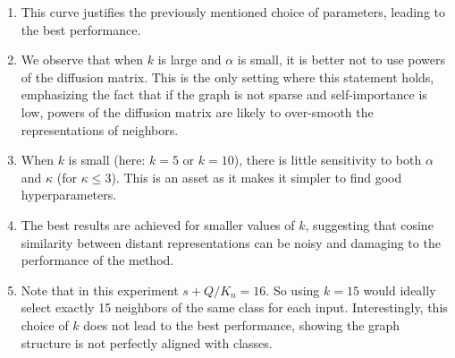 \documentclass[a4paper,conference]{IEEEtran}
\begin{document}
\begin{enumerate}
    \item This curve justifies the previously mentioned choice of parameters, leading to the best performance.
    \item We observe that when $k$ is large and $\alpha$ is small, it is better not to use powers of the diffusion matrix. This is the only setting where this statement holds, emphasizing the fact that if the graph is not sparse and self-importance is low, powers of the diffusion matrix are likely to over-smooth the representations of neighbors.
    \item When $k$ is small (here: $k=5$ or $k=10$), there is little sensitivity to both $\alpha$ and $\kappa$ (for $\kappa\leq 3$). This is an asset as it makes it simpler to find good hyperparameters.
    \item The best results are achieved for smaller values of $k$, suggesting that cosine similarity between distant representations can be noisy and damaging to the performance of the method.
    \item Note that in this experiment $s + Q/K_n = 16$. So using $k=15$ would ideally select exactly 15 neighbors of the same class for each input. Interestingly, this choice of $k$ does not lead to the best performance, showing the graph structure is not perfectly aligned with classes.
\end{enumerate}
\end{document}
